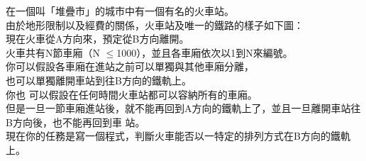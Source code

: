 在一個叫「堆疊市」的城市中有一個有名的火車站。\\
由於地形限制以及經費的關係，火車站及唯一的鐵路的樣子如下圖：\\
現在火車從A方向來，預定從B方向離開。\\
火車共有N節車廂（N $\leq$1000），並且各車廂依次以1到N來編號。\\
你可以假設各車廂在進站之前可以單獨與其他車廂分離，\\
也可以單獨離開車站到往B方向的鐵軌上。\\
你也 可以假設在任何時間火車站都可以容納所有的車廂。\\
但是一旦一節車廂進站後，就不能再回到A方向的鐵軌上了，並且一旦離開車站往B方向後，也不能再回到車 站。\\
現在你的任務是寫一個程式，判斷火車能否以一特定的排列方式在B方向的鐵軌上。\\
